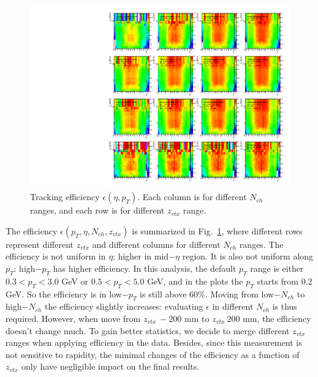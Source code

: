 \begin{figure}[H]
\centering
\includegraphics[width=1.\linewidth]{figs/sec_evtSlc/trkEff_pp13_eff_2D_wZvtx.pdf}
\caption{Tracking efficiency $\epsilon(\eta,p_{T})$. Each column is for different $N_{ch}$ ranges, and each row is for different $z_{vtx}$ range.}
\label{fig:trkEff_pp13_eff_2D_wZvtx}
\end{figure}

The efficiency $\epsilon(p_{T},\eta,N_{ch},z_{vtx})$ is summarized in Fig.~\ref{fig:trkEff_pp13_eff_2D_wZvtx}, where different rows represent different $z_{vtx}$ and different columns for different $N_{ch}$ ranges. The efficiency is not uniform in $\eta$: higher in mid$-\eta$ region. It is also not uniform along $p_{T}$: high$-p_{T}$ has higher efficiency. In this analysis, the default $p_{T}$ range is either $0.3<p_{T}<3.0$ GeV or $0.5<p_{T}<5.0$ GeV, and in the plots the $p_{T}$ starts from 0.2 GeV. So the efficiency is in low$-p_{T}$ is still above $60\%$. Moving from low$-N_{ch}$ to high$-N_{ch}$ the efficiency slightly increases: evaluating $\epsilon$ in different $N_{ch}$ is thus required. However, when move from $z_{vtx}~-200$ mm to $z_{vtx}~200$ mm, the efficiency doesn't change much. To gain better statistics, we decide to merge different $z_{vtx}$ ranges when applying efficiency in the data. Besides, since this measurement is not sensitive to rapidity, the minimal changes of the efficiency as a function of $z_{vtx}$ only have negligible impact on the final results.

